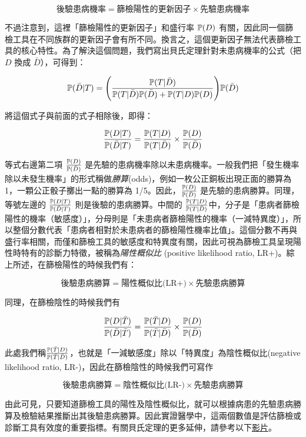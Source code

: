     \[\text{後驗患病機率}=\text{篩檢陽性的更新因子}\times\text{先驗患病機率}\]
    
    \noindent 不過注意到，這裡「篩檢陽性的更新因子」和盛行率 $\mathbb{P}(D)$ 有關，因此同一個篩檢工具在不同族群的更新因子會有所不同。換言之，這個更新因子無法代表篩檢工具的核心特性。為了解決這個問題，我們寫出貝氏定理針對未患病機率的公式（把 $D$ 換成 $\bar{D}$），可得到：
    
    \[\mathbb{P}(\bar{D}|T) = \Bigg(\frac{\mathbb{P}(T|\bar{D})}{\mathbb{P}(T|\bar{D})\mathbb{P}(\bar{D}) + \mathbb{P}(T|D)\mathbb{P}(D)}\Bigg) \mathbb{P}(\bar{D})\]
    
    \noindent 將這個式子與前面的式子相除後，即得：
    
    \[\frac{\mathbb{P}(D|T)}{\mathbb{P}(\bar{D}|T)} = \frac{\mathbb{P}(T|D)}{\mathbb{P}(T|\bar{D})} \times \frac{\mathbb{P}(D)}{\mathbb{P}(\bar{D})}\]
    
    \noindent 等式右邊第二項 $\frac{\mathbb{P}(D)}{\mathbb{P}(\bar{D})}$ 是先驗的患病機率除以未患病機率。一般我們把「發生機率除以未發生機率」的形式稱做\textit{勝算}(odds)，例如一枚公正銅板出現正面的勝算為 1，一顆公正骰子擲出一點的勝算為 1/5。因此，$\frac{\mathbb{P}(D)}{\mathbb{P}(\bar{D})}$ 是先驗的患病勝算。同理，等號左邊的 $\frac{\mathbb{P}(D|T)}{\mathbb{P}(\bar{D}|T)}$ 則是後驗的患病勝算。中間的 $\frac{\mathbb{P}(T|D)}{\mathbb{P}(T|\bar{D})}$中，分子是「患病者篩檢陽性的機率（敏感度）」，分母則是「未患病者篩檢陽性的機率（一減特異度）」，所以整個分數代表「患病者相對於未患病者的篩檢陽性機率比值」。這個分數不再與盛行率相關，而僅和篩檢工具的敏感度和特異度有關，因此可視為篩檢工具呈現陽性時特有的診斷力特徵，被稱為\textit{陽性概似比} (positive likelihood ratio, LR+)。綜上所述，在篩檢陽性的時候我們有：
    
    \[\text{後驗患病勝算}=\text{陽性概似比(LR+)}\times\text{先驗患病勝算}\]
    
    \noindent 同理，在篩檢陰性的時候我們有
    
    \[\frac{\mathbb{P}(D|\bar{T})}{\mathbb{P}(\bar{D}|\bar{T})} = \frac{\mathbb{P}(\bar{T}|D)}{\mathbb{P}(\bar{T}|\bar{D})} \times \frac{\mathbb{P}(D)}{\mathbb{P}(\bar{D})}\]
    
    \noindent 此處我們稱$\frac{\mathbb{P}(\bar{T}|D)}{\mathbb{P}(\bar{T}|\bar{D})}$，也就是「一減敏感度」除以「特異度」為陰性概似比(negative likelihood ratio, LR-)，因此在篩檢陰性的時候我們可寫作
    
    \[\text{後驗患病勝算}=\text{陰性概似比(LR-)}\times\text{先驗患病勝算}\]
    
    \noindent 由此可見，只要知道篩檢工具的陽性及陰性概似比，就可以根據病患的先驗患病勝算及檢驗結果推斷出其後驗患病勝算。因此實證醫學中，這兩個數值是評估篩檢或診斷工具有效度的重要指標。有關貝氏定理的更多延伸，請參考以下\href{https://www.youtube.com/watch?v=R13BD8qKeTg}{影片}。

